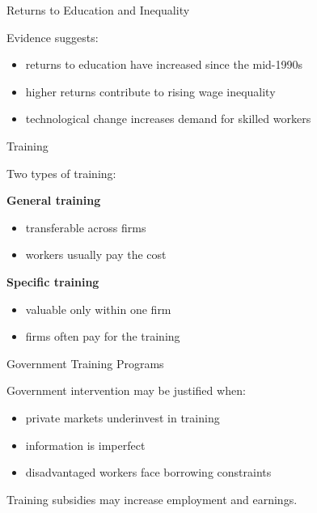 \documentclass[aspectratio=169]{beamer}
\begin{document}
\begin{frame}{Returns to Education and Inequality}

Evidence suggests:

\begin{itemize}
\item returns to education have increased since the mid-1990s
\item higher returns contribute to rising wage inequality
\item technological change increases demand for skilled workers
\end{itemize}
\end{frame}

\begin{frame}{Training}

Two types of training:

\textbf{General training}

\begin{itemize}
\item transferable across firms
\item workers usually pay the cost
\end{itemize}

\textbf{Specific training}

\begin{itemize}
\item valuable only within one firm
\item firms often pay for the training
\end{itemize}
\end{frame}

\begin{frame}{Government Training Programs}

Government intervention may be justified when:

\begin{itemize}
\item private markets underinvest in training
\item information is imperfect
\item disadvantaged workers face borrowing constraints
\end{itemize}

Training subsidies may increase employment and earnings.
\end{frame}
\end{document}
